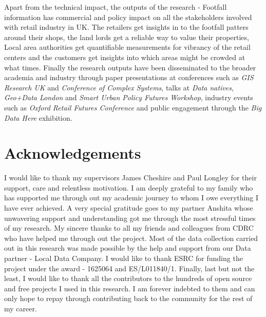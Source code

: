 Apart from the technical impact, the outputs of the research - Footfall information has commercial and policy impact on all the stakeholders involved with retail industry in UK. 
The retailers get insights in to the footfall patters around their shops, the land lords get a reliable way to value their properties, Local area authorities get quantifiable measurements for vibrancy of the retail centers and the customers get insights into which areas might be crowded at what times.
Finally the research outputs have been disseminated to the broader academia and industry through paper presentations at conferences such as \textit{GIS Research UK} and \textit{Conference of Complex Systems}, talks at \textit{Data natives}, \textit{Geo+Data London} and \textit{Smart Urban Policy Futures Workshop}, industry events such as \textit{Oxford Retail Futures Conference} and public engagement through the \textit{Big Data Here} exhibition.


\section*{Acknowledgements} 
I would like to thank my supervisors James Cheshire and Paul Longley for their support, care and relentless motivation.
I am deeply grateful to my family who has supported me through out my academic journey to whom I owe everything I have ever achieved.
A very special gratitude goes to my partner Anshita whose unwavering support and understanding got me through the most stressful times of my research.
My sincere thanks to all my friends and colleagues from CDRC who have helped me through out the project.
Most of the data collection carried out in this research was made possible by the help and support from our Data partner - Local Data Company.
I would like to thank ESRC for funding the project under the award - 1625064 and ES/L011840/1.
Finally, last but not the least, I would like to thank all the contributors to the hundreds of open source and free projects I used in this research. I am forever indebted to them and can only hope to repay through contributing back to the community for the rest of my career.
